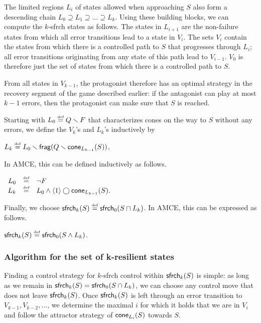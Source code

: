 The limited regions $L_i$ of states allowed when approaching 
$S$ also form a descending chain 
$L_0 \supseteq L_1 \supseteq \ldots \supseteq L_k$.
%
Using these building blocks, we can compute the $k$-sfrch states 
as follows. 
The states in $L_{i+1}$ are the non-failure states from which all 
error transitions lead to a state in $V_i$.
The sets $V_i$ contain the states from which there is a
controlled path to $S$ that progresses through $L_i$; 
all error transitions originating from any state 
of this path lead to $V_{i-1}$.
$V_0$ is therefore just the set of states from 
which there is a controlled path to $S$.

From all states in $V_{k-1}$, the protagonist 
therefore has an optimal strategy in the recovery segment  
of the game described earlier:
if the antagonist can play at most $k-1$ errors, 
then the protagonist can make sure that $S$ is reached.

Starting with $L_0 \stackrel{\mbox{\tiny def}}{=} Q \smallsetminus F$ that 
characterizes cones on the way to $S$ 
without any errors, 
we define the $V_k$'s and $L_k$'s inductively by
\begin{center} 
$L_k\stackrel{\mbox{\tiny def}}{=} L_0 \smallsetminus \mathsf{frag}(Q\smallsetminus \mathsf{cone}_{L_{k-1}}(S))$,
\end{center}

In AMCE, this can be defined inductively as follows. 
\begin{center} 
$\begin{array}{rcl} 
L_0   & \stackrel{\mbox{\tiny def}}{=} & \neg F \\
L_k   & \stackrel{\mbox{\tiny def}}{=} & L_0 \wedge \langle 1 \rangle \bigcirc \mathsf{cone}_{L_{k-1}}(S).\\
\end{array}$
\end{center} 

Finally, we choose $\mathsf{sfrch}_k(S) \stackrel{\mbox{\tiny def}}{=} \mathsf{sfrch}_0(S \cap L_k)$.  
In AMCE, this can be expressed as follows. 
\begin{center} 
$\mathsf{sfrch}_k(S)\stackrel{\mbox{\tiny def}}{=} \mathsf{sfrch}_0(S\wedge L_k)$.
\end{center}
\subsubsection{Algorithm for the set of k-resilient states}
Finding a control strategy for $k$-sfrch control within 
$\mathsf{sfrch}_k(S)$ is simple:
as long as we remain in $\mathsf{sfrch}_k(S)=\mathsf{sfrch}_0(S \cap L_k)$, 
we can choose any control move that does not leave $\mathsf{sfrch}_k(S)$.
Once $\mathsf{sfrch}_k(S)$ is left through an error transition to $V_{k-1},
V_{k-2}, ...$, 
we determine the maximal $i$ for which it holds that we are in $V_i$ 
and follow the attractor strategy of $\mathsf{cone}_{L_i}(S)$ towards $S$.


